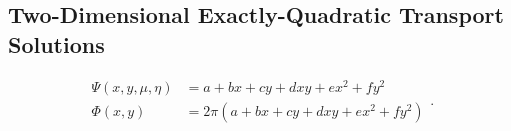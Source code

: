 \subsection{Two-Dimensional Exactly-Quadratic Transport Solutions}
\label{sec::BF_Results_Quadratic}

\begin{equation}
\label{eq::BF_Results_Quadratic_fluxsols}
\begin{aligned}
\Psi (x,y,\mu,\eta) &= a + bx + c y+ d xy + e x^2 + fy^2 \\
\Phi (x,y) &= 2 \pi \left(  a + bx + c y+ d xy + e x^2 + fy^2 \right)
\end{aligned} .
\end{equation}


